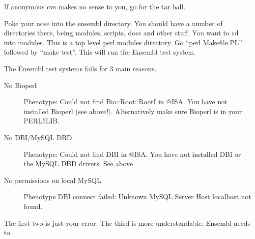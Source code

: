 \documentclass[11pt,a4paper]{article}
\begin{document}
If anonymous cvs makes no sense to you, go for the tar ball.

Poke your nose into the ensembl directory. You should have a number of directories there, being
modules, scripts, docs and other stuff. You want to cd into modules. This is a top level 
perl modules directory. Go ``perl Makefile.PL'' followed by ``make test''. This will run the
Ensembl test system.

The Ensembl test systems fails for 3 main reasons.

\begin{description}
\item[No Bioperl] Phenotype: Could not find Bio::Root::RootI in @ISA. You have not installed Bioperl
(see above!). Alternatively make sure Bioperl is in your PERL5LIB.
\item[No DBI/MySQL DBD] Phenotype: Could not find DBI in @ISA. You have not installed DBI or the
MySQL DBD drivers. See above 

\item[No permissions on local MySQL]
Phenotype DBI connect failed: Unknown MySQL Server Host localhost not
found.  

\end{description} 

The first two is just your error. The third is more understandable. Ensembl needs to 
\end{document}

